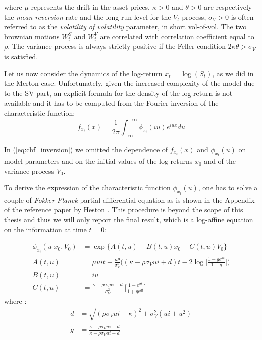 where $\mu$ represents the drift in the asset prices, $\kappa>0$ and $\theta>0$ are respectively the \textit{mean-reversion} rate  and the long-run level for the $V_t$ process, $\sigma_V>0$ is often referred to as the \textit{volatility of volatility} parameter, in short vol-of-vol.
The two brownian motions $W_t^S$ and $W_t^V$ are correlated with correlation coefficient equal to $\rho$.
The variance process is always strictly positive if the Feller condition $2\kappa\theta > \sigma_V$ is satisfied.

Let us now consider the dynamics of the log-return $x_t = \log (S_t)$, as we did in the Merton case. 
Unfortunately, given the increased complexity of the model due to the SV part, an explicit formula for the density of the log-return is not available and it has to be computed from the Fourier inversion of the characteristic function:
\begin{equation}
\label{eq:chf_inversion}
f_{x_t}(x) = \frac{1}{2\pi}\int_{-\infty}^{+\infty} \phi_{x_t}(i u) e^{i u x} du
\end{equation}

In (\ref{eq:chf_inversion}) we omitted the dependence of $f_{x_t}(x)$ and $\phi_{x_t}(u)$ on model parameters and on the initial values of the log-returns $x_0$ and of the variance process $V_0$. 

\bigskip

To derive the expression of the characteristic function $\phi_{x_t}(u)$, one has to solve a couple of \textit{Fokker-Planck} partial differential equation as is shown in the Appendix of the reference paper by Heston \cite{HESTON93}. This procedure is beyond the scope of this thesis and thus we will only report the final result, which is a log-affine equation on the information at time $t = 0$:

\begin{subequations}
\begin{align}
	\phi_{x_t}(u| x_0, V_0) &= \exp\{A(t,u) + B(t,u) x_0 + C(t,u) V_0\}\nonumber \\
	A(t,u) &= \mu u i t +  \frac{\kappa\theta}{\sigma_V^2} \bigg( (\kappa - \rho\sigma_V u i +d)t - 2 \log\Big[  \frac{1-ge^{dt}}{1-g} \Big] \bigg)\\
	B(t,u) &= i u \\
	C(t,u)&= \frac{\kappa - \rho\sigma_V u i +d}{\sigma_V^2} \:\Big[\frac{1-e^{dt}}{1+ge^{dt}}\Big]
\end{align}
\end{subequations} 
where :
\begin{equation*}
\begin{split}
d&=\sqrt{(\rho \sigma_V u i - \kappa)^2 + \sigma_V^2(u i + u^2)}\\
g&= \frac{\kappa - \rho\sigma_V u i + d}{\kappa - \rho\sigma_V u i - d}
\end{split}
\end{equation*} 



